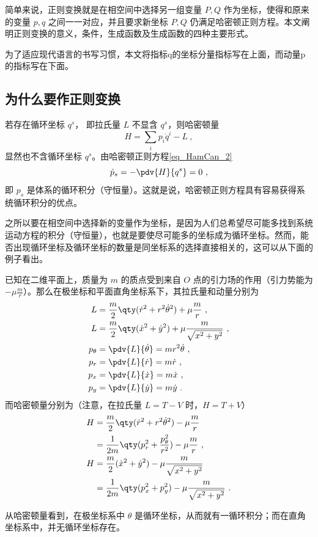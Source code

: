 

简单来说，正则变换就是在相空间中选择另一组变量 $P,Q$ 作为坐标，使得和原来的变量 $p,q$ 之间一一对应，并且要求新坐标 $P,Q$ 仍满足哈密顿正则方程。本文阐明正则变换的意义，条件，生成函数及生成函数的四种主要形式。

为了适应现代语言的书写习惯，本文将指标q的坐标分量指标写在上面，而动量p的指标写在下面。
\subsection{为什么要作正则变换}
若存在循环坐标 $q^s$， 即拉氏量 $L$ 不显含 $q^s$，则哈密顿量
\begin{equation}
H=\sum_i p_i\dot q^i-L~,
\end{equation}
显然也不含循环坐标 $q^s$。由哈密顿正则方程\autoref{eq_HamCan_2} 
\begin{equation}\label{eq_CanTra_7}
\dot p_s=-\pdv{H}{q^s}=0~,
\end{equation}
即 $p_s$ 是体系的循环积分（守恒量）。这就是说，哈密顿正则方程具有容易获得系统循环积分的优点。

之所以要在相空间中选择新的变量作为坐标，是因为人们总希望尽可能多找到系统运动方程的积分（守恒量），也就是要使尽可能多的坐标成为循环坐标。然而，能否出现循环坐标及循环坐标的数量是同坐标系的选择直接相关的，这可以从下面的例子看出。
\begin{example}{}
已知在二维平面上，质量为 $m$ 的质点受到来自 $O$ 点的引力场的作用（引力势能为 $-\mu\frac{m}{r}$）。那么在极坐标和平面直角坐标系下，其拉氏量和动量分别为
\begin{equation}
\begin{aligned}
L&=\frac{m}{2}\qty(\dot r^2+r^2\dot\theta^2)+\mu\frac{m}{r}~,\\
L&=\frac{m}{2}\qty(\dot x^2+\dot y^2)+\mu\frac{m}{\sqrt{x^2+y^2}}~,\\
p_\theta&=\pdv{L}{\dot \theta}=mr^2\dot\theta~,\\
p_r&=\pdv{L}{\dot r}=m\dot r~,\\
p_x&=\pdv{L}{\dot x}=m\dot x~,\\
p_y&=\pdv{L}{\dot y}=m\dot y~.
\end{aligned}
\end{equation}
而哈密顿量分别为（注意，在拉氏量 $L=T-V$ 时，$H=T+V$）
\begin{equation}
\begin{aligned}
H&=\frac{m}{2}\qty(\dot r^2+r^2\dot\theta^2)-\mu\frac{m}{r}\\
&=\frac{1}{2m}\qty(p_r^2+\frac{p_\theta^2}{r^2})-\mu\frac{m}{r}~,\\
H&=\frac{m}{2}(\dot x^2+\dot y^2)-\mu\frac{m}{\sqrt{x^2+y^2}}\\
&=\frac{1}{2m}\qty(p_x^2+p_y^2)-\mu\frac{m}{\sqrt{x^2+y^2}}~.
\end{aligned}
\end{equation}

从哈密顿量看到，在极坐标系中 $\theta$ 是循环坐标，从而就有一循环积分；而在直角坐标系中，并无循环坐标存在。 
\end{example}

